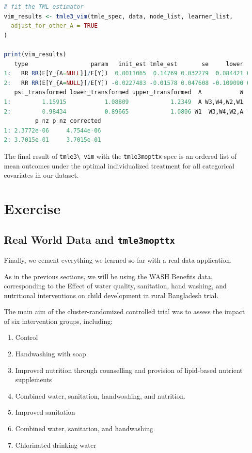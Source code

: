 \documentclass[
  12pt, krantz2,
]{book}
\newcommand{\passthrough}[1]{#1}
\theoremstyle{definition}
\theoremstyle{definition}
\theoremstyle{definition}
\newcommand{\1}{\mathbbm{1}}
\begin{document}
\begin{lstlisting}[language=R]
# fit the TML estimator
vim_results <- tmle3_vim(tmle_spec, data, node_list, learner_list,
  adjust_for_other_A = TRUE
)

print(vim_results)
   type                  param   init_est tmle_est       se     lower    upper
1:   RR RR(E[Y_{A=NULL}]/E[Y])  0.0011065  0.14769 0.032279  0.084421 0.210952
2:   RR RR(E[Y_{A=NULL}]/E[Y]) -0.0227483 -0.01578 0.047608 -0.109090 0.077529
   psi_transformed lower_transformed upper_transformed  A           W   Z_stat
1:         1.15915           1.08809            1.2349  A W3,W4,W2,W1  4.57534
2:         0.98434           0.89665            1.0806 W1  W3,W4,W2,A -0.33146
         p_nz p_nz_corrected
1: 2.3772e-06     4.7544e-06
2: 3.7015e-01     3.7015e-01
\end{lstlisting}

The final result of \passthrough{\lstinline!tmle3\_vim!} with the \passthrough{\lstinline!tmle3mopttx!} spec is an ordered list
of mean outcomes under the optimal individualized treatment for all categorical
covariates in our dataset.

\hypertarget{exercise}{%
\section{Exercise}\label{exercise}}

\hypertarget{real-world-data-and-tmle3mopttx}{%
\subsection{\texorpdfstring{Real World Data and \texttt{tmle3mopttx}}{Real World Data and tmle3mopttx}}\label{real-world-data-and-tmle3mopttx}}

Finally, we cement everything we learned so far with a real data application.

As in the previous sections, we will be using the WASH Benefits data,
corresponding to the Effect of water quality, sanitation, hand washing, and
nutritional interventions on child development in rural Bangladesh trial.

The main aim of the cluster-randomized controlled trial was to assess the
impact of six intervention groups, including:

\begin{enumerate}
\def\labelenumi{\arabic{enumi}.}
\item
  Control
\item
  Handwashing with soap
\item
  Improved nutrition through counselling and provision of lipid-based nutrient supplements
\item
  Combined water, sanitation, handwashing, and nutrition.
\item
  Improved sanitation
\item
  Combined water, sanitation, and handwashing
\item
  Chlorinated drinking water
\end{enumerate}
\end{document}

